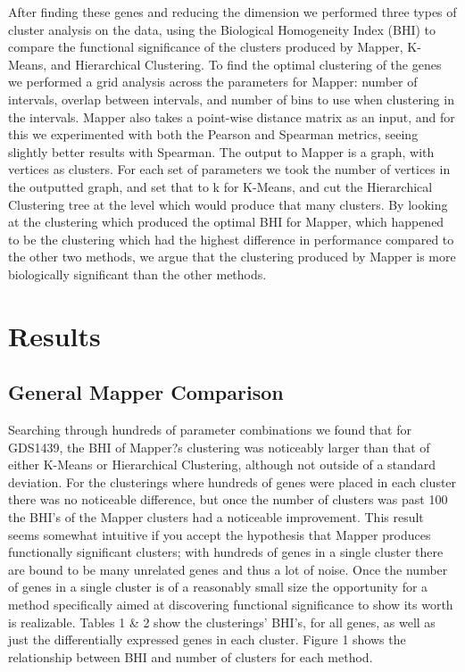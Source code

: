 \documentclass[preprint,10pt]{elsarticle}
\begin{document}
	After finding these genes and reducing the dimension we performed three types of cluster analysis on the data, using the Biological Homogeneity Index (BHI) to compare the functional significance of the clusters produced by Mapper, K-Means, and Hierarchical Clustering. To find the optimal clustering of the genes we performed a grid analysis across the parameters for Mapper: number of intervals, overlap between intervals, and number of bins to use when clustering in the intervals. Mapper also takes a point-wise distance matrix as an input, and for this we experimented with both the Pearson and Spearman metrics, seeing slightly better results with Spearman. The output to Mapper is a graph, with vertices as clusters. For each set of parameters we took the number of vertices in the outputted graph, and set that to k for K-Means, and cut the Hierarchical Clustering tree at the level which would produce that many clusters. By looking at the clustering which produced the optimal BHI for Mapper, which happened to be the clustering which had the highest difference in performance compared to the other two methods, we argue that the clustering produced by Mapper is more biologically significant than the other methods.


\section{Results}


\subsection{General Mapper Comparison}
	Searching through hundreds of parameter combinations we found that for GDS1439, the BHI of Mapper?s clustering was noticeably larger than that of either K-Means or Hierarchical Clustering, although not outside of a standard deviation. For the clusterings where hundreds of genes were placed in each cluster there was no noticeable difference, but once the number of clusters was past 100 the BHI's of the Mapper clusters had a noticeable improvement. This result seems somewhat intuitive if you accept the hypothesis that Mapper produces functionally significant clusters; with hundreds of genes in a single cluster there are bound to be many unrelated genes and thus a lot of noise. Once the number of genes in a single cluster is of a reasonably small size the opportunity for a method specifically aimed at discovering functional significance to show its worth is realizable. Tables 1 \& 2 show the clusterings' BHI's, for all genes, as well as just the differentially expressed genes in each cluster. Figure 1 shows the relationship between BHI and number of clusters for each method.	
	
\end{document}

